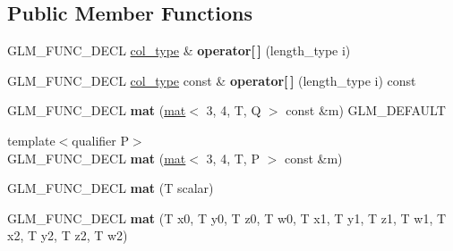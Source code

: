 \subsection*{Public Member Functions}
\begin{DoxyCompactItemize}
\item 
\mbox{\label{structglm_1_1mat_3_013_00_014_00_01T_00_01Q_01_4_a2cc3ce3e5d6807a9ec433b51f16ecd8a}} 
G\+L\+M\+\_\+\+F\+U\+N\+C\+\_\+\+D\+E\+CL \hyperlink{structglm_1_1vec_3_014_00_01T_00_01Q_01_4}{col\+\_\+type} \& {\bfseries operator\mbox{[}$\,$\mbox{]}} (length\+\_\+type i)
\item 
\mbox{\label{structglm_1_1mat_3_013_00_014_00_01T_00_01Q_01_4_a1abef793b9078730b053df8ff6a37256}} 
G\+L\+M\+\_\+\+F\+U\+N\+C\+\_\+\+D\+E\+CL \hyperlink{structglm_1_1vec_3_014_00_01T_00_01Q_01_4}{col\+\_\+type} const  \& {\bfseries operator\mbox{[}$\,$\mbox{]}} (length\+\_\+type i) const
\item 
\mbox{\label{structglm_1_1mat_3_013_00_014_00_01T_00_01Q_01_4_a5fa6fd5bcd2b5d7e7dc8a3ca5fa74ff2}} 
G\+L\+M\+\_\+\+F\+U\+N\+C\+\_\+\+D\+E\+CL {\bfseries mat} (\hyperlink{structglm_1_1mat}{mat}$<$ 3, 4, T, Q $>$ const \&m) G\+L\+M\+\_\+\+D\+E\+F\+A\+U\+LT
\item 
\mbox{\label{structglm_1_1mat_3_013_00_014_00_01T_00_01Q_01_4_a294027e4234e8d97df732ca434ad7d42}} 
{\footnotesize template$<$qualifier P$>$ }\\G\+L\+M\+\_\+\+F\+U\+N\+C\+\_\+\+D\+E\+CL {\bfseries mat} (\hyperlink{structglm_1_1mat}{mat}$<$ 3, 4, T, P $>$ const \&m)
\item 
\mbox{\label{structglm_1_1mat_3_013_00_014_00_01T_00_01Q_01_4_a7a2871b54972096ce3d122d465f2cf7c}} 
G\+L\+M\+\_\+\+F\+U\+N\+C\+\_\+\+D\+E\+CL {\bfseries mat} (T scalar)
\item 
\mbox{\label{structglm_1_1mat_3_013_00_014_00_01T_00_01Q_01_4_a63033547c17327c6ca2099836631d2a1}} 
G\+L\+M\+\_\+\+F\+U\+N\+C\+\_\+\+D\+E\+CL {\bfseries mat} (T x0, T y0, T z0, T w0, T x1, T y1, T z1, T w1, T x2, T y2, T z2, T w2)

\end{DoxyCompactItemize}
